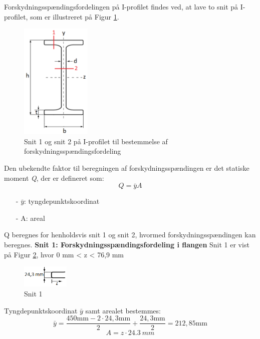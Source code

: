 Forskydningsspændingsfordelingen på I-profilet findes ved, at lave to snit på I-profilet, som er illustreret på Figur \ref{fig:snitsnit}. 

\begin{figure}[H]
	\centering
	\includegraphics[width=0.3\textwidth]{billeder/forskydningprofil.png}
	\caption{Snit 1 og snit 2 på I-profilet til bestemmelse af forskydningsspændingsfordeling}
	\label{fig:snitsnit}
\end{figure}

Den ubekendte faktor til beregningen af forskydningsspændingen er det statiske moment \textit{Q}, der er defineret som:
\begin{equation}
Q = \bar{y}A
\end{equation}
\begin{itemize}
	\item[-] $\bar{y}$: tyngdepunktskoordinat
	\item[-] A: areal
\end{itemize}

Q beregnes for henholdsvis snit 1 og snit 2, hvormed forskydningsspændingen kan beregnes. 
\newline
\newline
\textbf{Snit 1: Forskydningsspændingsfordeling i flangen}
\newline
Snit 1 er vist på Figur \ref{fig:snitetforskyd}, hvor 0 mm < z < 76,9 mm

\begin{figure}[H]
	\centering
	\includegraphics[width=0.2\textwidth]{billeder/snitetforskydning.png}
	\caption{Snit 1}
	\label{fig:snitetforskyd}
\end{figure}

Tyngdepunktskoordinat $\bar{y}$ samt arealet bestemmes:
\begin{equation}
\bar{y} = \frac{450 \text{mm} - 2 \cdot 24,\!3 \text{mm}}{2} + \frac{24,\!3 \text{mm}}{2} = 212,\!85 \text{mm}
\end{equation}
\begin{equation}
A = z \cdot \SI{24,3}{mm}
\end{equation}

